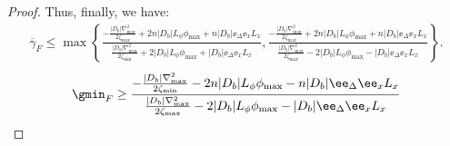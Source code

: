 \begin{proof}
Thus, finally, we have:
\begin{align}
 \overline{\gamma}_F \le \max\left\{  \frac{   -\frac{|D_b|\nabla_{\max} ^2}{2\zeta_{\max}}+2n|D_b| L_\phi \phi_{\max} + n|D_b| \ee_{\Delta} \ee_x L_x}{\frac{|D_b|\nabla_{\max} ^2}{2\zeta_{\min}}+2|D_b| L_\phi \phi_{\max} + |D_b| \ee_{\Delta} \ee_x L_x  }, 
 \frac{   -\frac{|D_b|\nabla_{\max} ^2}{2\zeta_{\max}}+2n|D_b| L_\phi \phi_{\max} + n|D_b| \ee_{\Delta} \ee_x L_x}{\frac{|D_b|\nabla_{\max} ^2}{2\zeta_{\max}}-2|D_b| L_\phi \phi_{\max} - |D_b| \ee_{\Delta} \ee_x L_x  }
 \right\}. 
\end{align}
\begin{align}
 \gmin_F \ge   
 \frac{   -\frac{|D_b|\nabla_{\max} ^2}{2\zeta_{\min}}-2n|D_b| L_\phi \phi_{\max} - n|D_b| \ee_{\Delta} \ee_x L_x}{\frac{|D_b|\nabla_{\max} ^2}{2\zeta_{\max}}-2|D_b| L_\phi \phi_{\max} - |D_b| \ee_{\Delta} \ee_x L_x  }
\end{align}
\end{proof}


